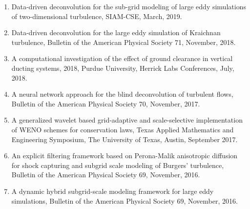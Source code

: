 \documentclass[letterpaper]{article}
\renewenvironment{itemize}{
  \begin{list}{}{
    \setlength{\leftmargin}{1.5em}
  }
}{
  \end{list}
}
\begin{document}
\begin{enumerate}
\item Data-driven deconvolution for the sub-grid modeling of large eddy simulations of two-dimensional turbulence, SIAM-CSE, March, 2019.

\item Data-driven deconvolution for the large eddy simulation of Kraichnan turbulence, Bulletin of the American Physical Society 71, November, 2018.

\item A computational investigation of the effect of ground clearance in vertical ducting systems, 2018, Purdue University, Herrick Labs Conferences, July, 2018. 

\item A neural network approach for the blind deconvolution of turbulent flows, Bulletin of the American Physical Society 70, November, 2017.

\item A generalized wavelet based grid-adaptive and scale-selective implementation of WENO schemes for conservation laws, Texas Applied Mathematics and Engineering Symposium, The University of Texas, Austin, September 2017.

\item An explicit filtering framework based on Perona-Malik anisotropic diffusion for shock capturing and subgrid scale modeling of Burgers' turbulence, Bulletin of the American Physical Society 69, November, 2016.

\item A dynamic hybrid subgrid-scale modeling framework for large eddy simulations, Bulletin of the American Physical Society 69, November, 2016.

\end{enumerate}



\end{document}
